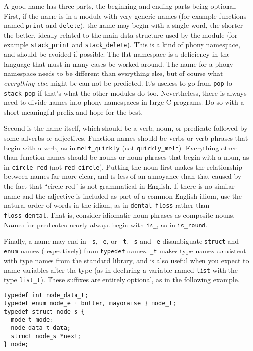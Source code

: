 \documentclass{lulu}
\newcommand{\code}[1]{\texttt{#1}\xspace}
\begin{document}
A good name has three parts, the beginning and ending parts being
optional.  First, if the name is in a module with very generic names
(for example functions named \code{print} and \code{delete}), the name
may begin with a single word, the shorter the better, ideally related
to the main data structure used by the module (for example
\code{stack\_print} and \code{stack\_delete}).  This is a kind of
phony namespace, and should be avoided if possible.  The flat
namespace is a deficiency in the language that must in many cases be
worked around.  The name for a phony namespace needs to be different
than everything else, but of course what \emph{everything else} might
be can not be predicted.  It's useless to go from \code{pop} to
\code{stack\_pop} if that's what the other modules do too.
Nevertheless, there is always need to divide names into phony
namespaces in large C programs.  Do so with a short meaningful prefix
and hope for the best.

Second is the name itself, which should be a verb, noun, or predicate
followed by some adverbs or adjectives.  Function names should be
verbs or verb phrases that begin with a verb, as in
\code{melt\_quickly} (not \code{quickly\_melt}).  Everything other
than function names should be nouns or noun phrases that begin with a
noun, as in \code{circle\_red} (not \code{red\_circle}).  Putting the
noun first makes the relationship between names far more clear, and is
less of an annoyance than that caused by the fact that ``circle red''
is not grammatical in English.  If there is no similar name and the
adjective is included as part of a common English idiom, use the
natural order of words in the idiom, as in \code{dental\_floss} rather
than \code{floss\_dental}.  That is, consider idiomatic noun phrases
as composite nouns.  Names for predicates nearly always begin with
\code{is\_}, as in \code{is\_round}.

Finally, a name may end in \code{\_s}, \code{\_e}, or \code{\_t}.
\code{\_s} and \code{\_e} disambiguate \code{struct} and \code{enum}
names (respectively) from \code{typedef} names.  \code{\_t} makes type
names consistent with type names from the standard library, and is
also useful when you expect to name variables after the type (as in
declaring a variable named \code{list} with the type \code{list\_t}).
These suffixes are entirely optional, as in the following example.

\begin{samepage}
\begin{verbatim}
typedef int node_data_t;
typedef enum mode_e { butter, mayonaise } mode_t;
typedef struct node_s {
  mode_t mode;
  node_data_t data;
  struct node_s *next;
} node;
\end{verbatim}
\end{samepage}
\end{document}
